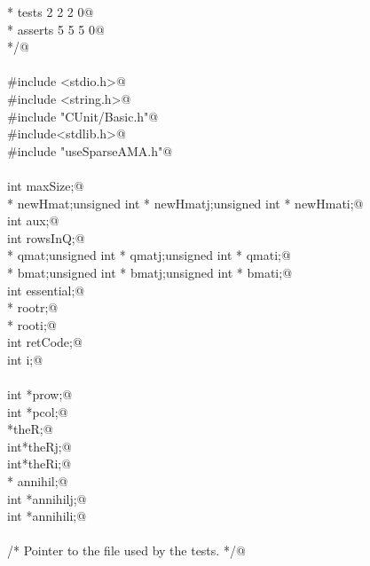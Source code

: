 \documentclass[12pt]{article}
\begin{document}
\begin{flushleft}
\begin{minipage}{\linewidth}
\begin{list}{}{}
\mbox{}\verb@ *                      tests         2       2       2       0@\\
\mbox{}\verb@ *                      asserts       5       5       5       0@\\
\mbox{}\verb@ */@\\
\mbox{}\verb@@\\
\mbox{}\verb@#include <stdio.h>@\\
\mbox{}\verb@#include <string.h>@\\
\mbox{}\verb@#include "CUnit/Basic.h"@\\
\mbox{}\verb@#include<stdlib.h>@\\
\mbox{}\verb@#include "useSparseAMA.h"@\\
\mbox{}\verb@@\\
\mbox{}\verb@unsigned int maxSize;@\\
\mbox{}\verb@double * newHmat;unsigned int * newHmatj;unsigned int * newHmati;@\\
\mbox{}\verb@unsigned int aux;@\\
\mbox{}\verb@unsigned int rowsInQ;@\\
\mbox{}\verb@double * qmat;unsigned int * qmatj;unsigned int * qmati;@\\
\mbox{}\verb@double * bmat;unsigned int * bmatj;unsigned int * bmati;@\\
\mbox{}\verb@unsigned int essential;@\\
\mbox{}\verb@double * rootr;@\\
\mbox{}\verb@double * rooti;@\\
\mbox{}\verb@unsigned int retCode;@\\
\mbox{}\verb@unsigned int i;@\\
\mbox{}\verb@@\\
\mbox{}\verb@unsigned int *prow;@\\
\mbox{}\verb@unsigned int *pcol;@\\
\mbox{}\verb@double *theR;@\\
\mbox{}\verb@unsigned int*theRj;@\\
\mbox{}\verb@unsigned int*theRi;@\\
\mbox{}\verb@double * annihil;@\\
\mbox{}\verb@unsigned int *annihilj;@\\
\mbox{}\verb@unsigned int *annihili;@\\
\mbox{}\verb@@\\
\mbox{}\verb@/* Pointer to the file used by the tests. */@\\
\mbox{}\verb@@\\

\end{list}
\end{minipage}
\end{flushleft}
\end{document}
